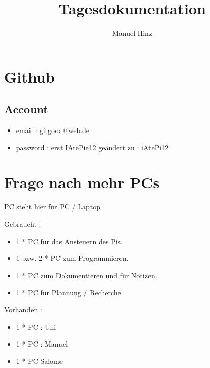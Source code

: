 \documentclass{article}
\author{Manuel Hinz}
\title{Tagesdokumentation}
\begin{document}
\maketitle

\section{Github}

\subsection{Account}

\begin{itemize}

\item email : gitgood@web.de

\item password : erst IAtePie12 ge\"{a}ndert zu : iAtePi12

\end{itemize}

\section{Frage nach mehr PCs}

PC steht hier f\"{u}r PC / Laptop

Gebraucht : 

\begin{itemize}

\item 1 * PC f\"{u}r das Ansteuern des Pis.

\item 1 bzw. 2 * PC zum Programmieren.

\item 1 * PC zum Dokumentieren und f\"{u}r Notizen.

\item 1 * PC f\"{u}r Plannung / Recherche 

\end{itemize}

Vorhanden : 

\begin{itemize}

\item 1 * PC  : Uni

\item 1 * PC  : Manuel

\item 1 * PC Salome  

\end{itemize}
\end{document}
